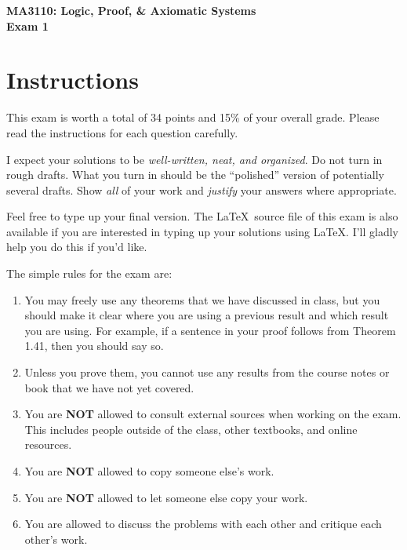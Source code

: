 \documentclass[11pt]{article}
\theoremstyle{definition}
\begin{document}
\begin{center}

{\Large\bf MA3110: Logic, Proof, \& Axiomatic Systems}\\
\smallskip
{\Large\bf Exam 1}

\bigskip

  
  \bigskip
  

\end{center}

\section*{Instructions}

This exam is worth a total of 34 points and 15\% of your overall grade.  Please read the instructions for each question carefully.

\bigskip

I expect your solutions to be \emph{well-written, neat, and organized}.  Do not turn in rough drafts.  What you turn in should be the ``polished'' version of potentially several drafts.  Show \emph{all} of your work and \emph{justify} your answers where appropriate. 
 
\bigskip

Feel free to type up your final version.  The \LaTeX\ source file of this exam is also available if you are interested in typing up your solutions using \LaTeX.  I'll gladly help you do this if you'd like.

\bigskip

The simple rules for the exam are:

\begin{enumerate}
\item You may freely use any theorems that we have discussed in class, but you should make it clear where you are using a previous result and which result you are using.  For example, if a sentence in your proof follows from Theorem 1.41, then you should say so.
\item Unless you prove them, you cannot use any results from the course notes or book that we have not yet covered.
\item You are \textbf{NOT} allowed to consult external sources when working on the exam.  This includes people outside of the class, other textbooks, and online resources.
\item You are \textbf{NOT} allowed to copy someone else's work.
\item You are \textbf{NOT} allowed to let someone else copy your work.
\item You are allowed to discuss the problems with each other and critique each other's work.
\end{enumerate}
\end{document}
